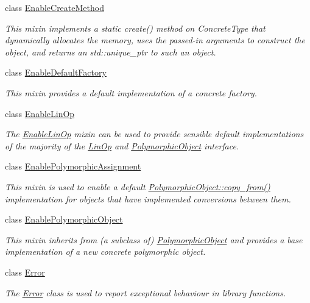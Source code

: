 \begin{DoxyCompactItemize}
class \hyperlink{classgko_1_1EnableCreateMethod}{Enable\+Create\+Method}
\begin{DoxyCompactList}\small\item\em This mixin implements a static {\ttfamily create()} method on {\ttfamily Concrete\+Type} that dynamically allocates the memory, uses the passed-\/in arguments to construct the object, and returns an std\+::unique\+\_\+ptr to such an object. \end{DoxyCompactList}\item 
class \hyperlink{classgko_1_1EnableDefaultFactory}{Enable\+Default\+Factory}
\begin{DoxyCompactList}\small\item\em This mixin provides a default implementation of a concrete factory. \end{DoxyCompactList}\item 
class \hyperlink{classgko_1_1EnableLinOp}{Enable\+Lin\+Op}
\begin{DoxyCompactList}\small\item\em The \hyperlink{classgko_1_1EnableLinOp}{Enable\+Lin\+Op} mixin can be used to provide sensible default implementations of the majority of the \hyperlink{classgko_1_1LinOp}{Lin\+Op} and \hyperlink{classgko_1_1PolymorphicObject}{Polymorphic\+Object} interface. \end{DoxyCompactList}\item 
class \hyperlink{classgko_1_1EnablePolymorphicAssignment}{Enable\+Polymorphic\+Assignment}
\begin{DoxyCompactList}\small\item\em This mixin is used to enable a default \hyperlink{classgko_1_1PolymorphicObject_a5e6f713938293cfbe788d00480eb4d81}{Polymorphic\+Object\+::copy\+\_\+from()} implementation for objects that have implemented conversions between them. \end{DoxyCompactList}\item 
class \hyperlink{classgko_1_1EnablePolymorphicObject}{Enable\+Polymorphic\+Object}
\begin{DoxyCompactList}\small\item\em This mixin inherits from (a subclass of) \hyperlink{classgko_1_1PolymorphicObject}{Polymorphic\+Object} and provides a base implementation of a new concrete polymorphic object. \end{DoxyCompactList}\item 
class \hyperlink{classgko_1_1Error}{Error}
\begin{DoxyCompactList}\small\item\em The \hyperlink{classgko_1_1Error}{Error} class is used to report exceptional behaviour in library functions. \end{DoxyCompactList}\item 

\end{DoxyCompactItemize}
